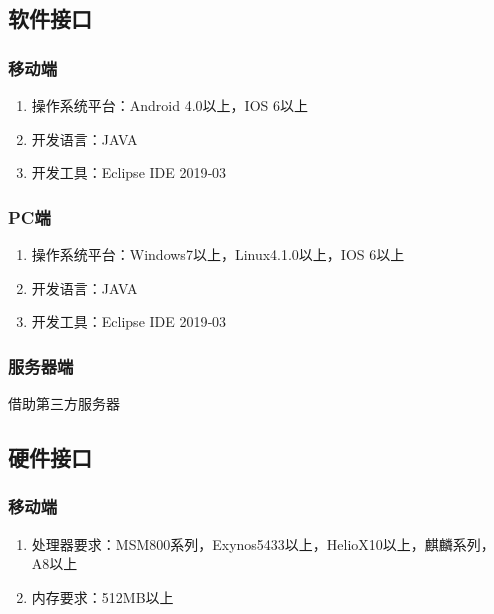 \subsection{软件接口}
\subsubsection{移动端}
	\begin{enumerate}
		\item 操作系统平台：Android 4.0以上，IOS 6以上
		\item 开发语言：JAVA
		\item 开发工具：Eclipse IDE 2019‑03
	\end{enumerate}
\subsubsection{PC端}
	\begin{enumerate}
		\item 操作系统平台：Windows7以上，Linux4.1.0以上，IOS 6以上
		\item 开发语言：JAVA
		\item 开发工具：Eclipse IDE 2019‑03
	\end{enumerate}
\subsubsection{服务器端}
	借助第三方服务器
\subsection{硬件接口}
\subsubsection{移动端}
	\begin{enumerate}
		\item 处理器要求：MSM800系列，Exynos5433以上，HelioX10以上，麒麟系列，A8以上
		\item 内存要求：512MB以上
	\end{enumerate}
